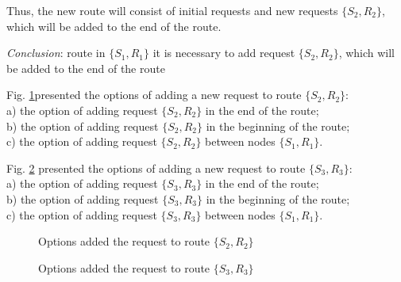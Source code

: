 \documentclass[]{TAACpaper}
\begin{document}
Thus, the new route will consist of initial requests and new requests  $\{S_2,R_2\}$, which will be added to the end of the route.

			
\textit{Conclusion}: route in $\{S_1,R_1\}$ it is necessary to add  request $\{S_2,R_2\}$, which will be added to the end of the route


Fig. \ref{ris:pict2}presented the options of adding a new request to route $\{S_2,R_2\}$:\\
a) the option of adding request $\{S_2,R_2\}$ in the end of the route;\\
b) the option of adding request $\{S_2,R_2\}$ in the beginning of the route;\\
c) the option of adding request $\{S_2,R_2\}$ between nodes $\{S_1,R_1\}$.

Fig. \ref{ris:pict3} presented the options of adding a new request to route $\{S_3,R_3\}$:\\
a) the option of adding request $\{S_3,R_3\}$ in the end of the route;\\
b) the option of adding request $\{S_3,R_3\}$ in the beginning of the route;\\
c) the option of adding request $\{S_3,R_3\}$ between nodes $\{S_1,R_1\}$.

\begin{figure}[t]
	\caption{Options added  the request to route $\{S_2,R_2\}$}
	\label{ris:pict2}
\end{figure}

\begin{figure}[t]
	\caption{Options added the request to route $\{S_3,R_3\}$}
	\label{ris:pict3}
\end{figure}
\end{document}
